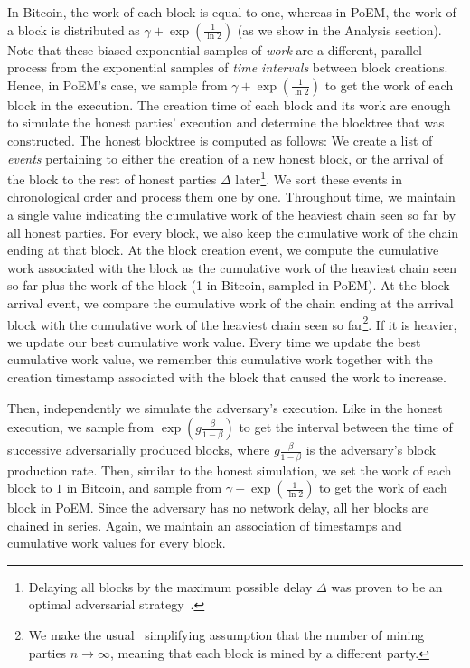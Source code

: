 In Bitcoin, the work of each block is equal to one,
whereas in PoEM, the work of a block is
distributed as $\gamma + \exp(\frac{1}{\ln2})$ (as we show in the Analysis section). Note that these biased exponential samples of \emph{work} are a different,
parallel process from the exponential samples of \emph{time intervals} between block creations.
Hence, in PoEM's case, we sample from $\gamma + \exp(\frac{1}{\ln2})$ to get the work
of each block in the execution. The creation time of each block and its work are enough to simulate the honest parties' execution
and determine the blocktree that was constructed.
The honest blocktree is computed as follows: We create a list of \emph{events} pertaining to either the creation of a new honest block,
or the arrival of the block to the rest of honest parties $\Delta$ later\footnote{Delaying all blocks by the maximum possible delay $\Delta$
was proven to be an optimal adversarial strategy~\cite{eiar}.}.
We sort these events in chronological order and process them one by one.
Throughout time, we maintain a single value indicating the cumulative work of the heaviest chain seen so far by all honest parties.
For every block, we also keep the cumulative work of the chain ending at that block.
At the block creation event, we compute the cumulative work associated with the block as the cumulative work of the
heaviest chain seen so far plus the work of the block (1 in Bitcoin, sampled in PoEM). At the block arrival event, we compare the
cumulative work of the chain ending at the arrival block with the cumulative work of the heaviest chain seen so
far\footnote{We make the usual~\cite{eiar} simplifying assumption that the number of mining parties $n \to \infty$, meaning
that each block is mined by a different party.}.
If it is heavier, we update our best cumulative work value. Every time we update the best cumulative work value,
we remember this cumulative work together with the creation timestamp associated with the block that caused the work to increase.

Then, independently we simulate the adversary's execution. Like in the honest execution, we sample from $\exp(g\frac{\beta}{1 - \beta})$
to get the interval between the time of successive adversarially produced blocks, where $g\frac{\beta}{1 - \beta}$ is the adversary's block production rate.
Then, similar to the honest simulation, we set the work of each block to $1$ in Bitcoin, and sample from $\gamma + \exp(\frac{1}{\ln2})$ to get the work of each block in PoEM.
Since the adversary has no network delay, all her blocks are chained in series.
Again, we maintain an association of timestamps and cumulative work values for every block.

